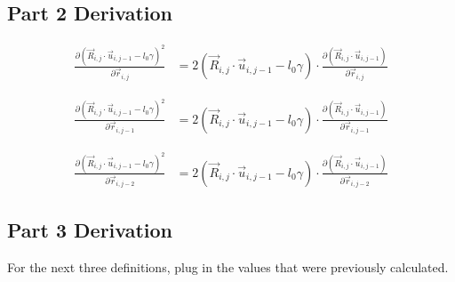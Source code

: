 \documentclass{article}
\renewcommand{\ij}{_{i,j}}
\newcommand{\ijj}{_{i,j-1}}
\newcommand{\ijjj}{_{i,j-2}}
\renewcommand{\part}[2]{\frac{\partial #1 }{\partial #2}}
\newcommand{\rij}{\vec{r} \ij}
\newcommand{\Rij}{\vec{R} \ij}
\newcommand{\rijj}{\vec{r} \ijj}
\newcommand{\rijjj}{\vec{r} \ijjj}
\newcommand{\uijj}{\vec{u} \ijj}
\begin{document}
\subsection{Part 2 Derivation}

\begin{align*}
  \part{\left(\Rij \cdot \uijj - l_0\gamma\right)^2}{\rij }
  &=
2(\Rij \cdot \uijj - l_0\gamma)
\cdot 
\part{\left(\Rij \cdot \uijj\right)}{\rij}
\end{align*}

\begin{align*}
  \part{\left(\Rij \cdot \uijj - l_0\gamma\right)^2}{\rijj }
  &=
2(\Rij \cdot \uijj - l_0\gamma)
\cdot 
\part{\left(\Rij \cdot \uijj\right)}{\rijj}
\end{align*}

\begin{align*}
  \part{\left(\Rij \cdot \uijj - l_0\gamma\right)^2}{\rijjj }
  &=
2(\Rij \cdot \uijj - l_0\gamma)
\cdot 
\part{\left(\Rij \cdot \uijj\right)}{\rijjj}
\end{align*}

\subsection{Part 3 Derivation}
For the next three definitions, plug in the values that were previously calculated. 
\end{document}
